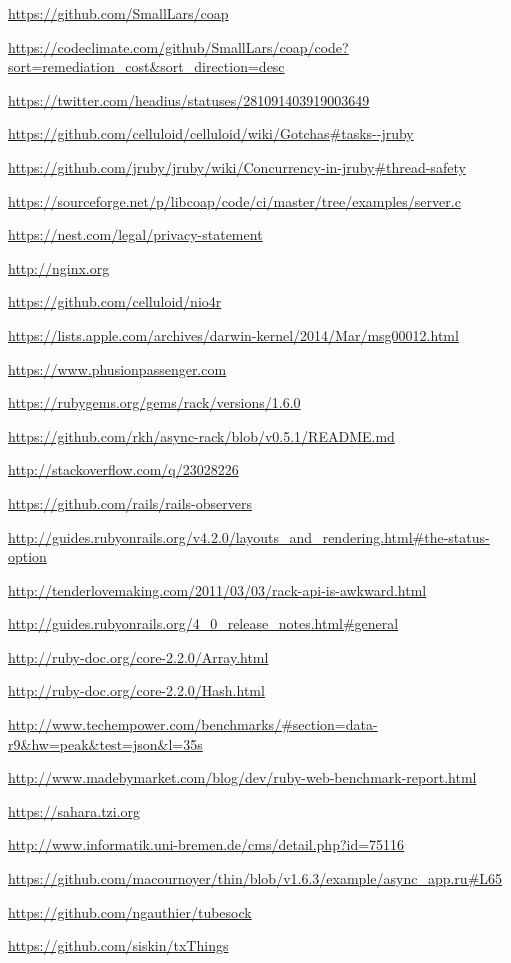 \urldef{\urlGobiCoap}
	\url{https://github.com/SmallLars/coap}

\urldef{\urlGobiCoapCC}
	\url{https://codeclimate.com/github/SmallLars/coap/code?sort=remediation_cost&sort_direction=desc}

\urldef{\urlJRubyCExt}
	\url{https://twitter.com/headius/statuses/281091403919003649}

\urldef{\urlJrubyFiber}
	\url{https://github.com/celluloid/celluloid/wiki/Gotchas#tasks--jruby}

\urldef{\urlJrubyThreadsafe}
	\url{https://github.com/jruby/jruby/wiki/Concurrency-in-jruby#thread-safety}

\urldef{\urlLibcoapExample}
	\url{https://sourceforge.net/p/libcoap/code/ci/master/tree/examples/server.c}

\urldef{\urlNestPrivacy}
	\url{https://nest.com/legal/privacy-statement}

\urldef{\urlNginx}
	\url{http://nginx.org}

\urldef{\urlNio}
	\url{https://github.com/celluloid/nio4r}

\urldef{\urlOsxMcast}
	\url{https://lists.apple.com/archives/darwin-kernel/2014/Mar/msg00012.html}

\urldef{\urlPassenger}
	\url{https://www.phusionpassenger.com}

\urldef{\urlRack}
	\url{https://rubygems.org/gems/rack/versions/1.6.0}

\urldef{\urlRackAsync}
	\url{https://github.com/rkh/async-rack/blob/v0.5.1/README.md}

\urldef{\urlRackDupCall}
	\url{http://stackoverflow.com/q/23028226}

\urldef{\urlRailsObservers}
	\url{https://github.com/rails/rails-observers}

\urldef{\urlRailsStatusCodes}
	\url{http://guides.rubyonrails.org/v4.2.0/layouts_and_rendering.html#the-status-option}

\urldef{\urlRailsStreamingA}
	\url{http://tenderlovemaking.com/2011/03/03/rack-api-is-awkward.html}

\urldef{\urlRailsThreadsafe}
	\url{http://guides.rubyonrails.org/4_0_release_notes.html#general}

\urldef{\urlRubyArray}
	\url{http://ruby-doc.org/core-2.2.0/Array.html}

\urldef{\urlRubyHash}
	\url{http://ruby-doc.org/core-2.2.0/Hash.html}

\urldef{\urlRubyWebBenchOne}
	\url{http://www.techempower.com/benchmarks/#section=data-r9&hw=peak&test=json&l=35s}

\urldef{\urlRubyWebBenchTwo}
	\url{http://www.madebymarket.com/blog/dev/ruby-web-benchmark-report.html}

\urldef{\urlSaharaOne}
	\url{https://sahara.tzi.org}

\urldef{\urlSaharaTwo}
	\url{http://www.informatik.uni-bremen.de/cms/detail.php?id=75116}

\urldef{\urlThinDeferrableBody}
	\url{https://github.com/macournoyer/thin/blob/v1.6.3/example/async_app.ru#L65}

\urldef{\urlTubesock}
	\url{https://github.com/ngauthier/tubesock}

\urldef{\urlTxThings}
	\url{https://github.com/siskin/txThings}
